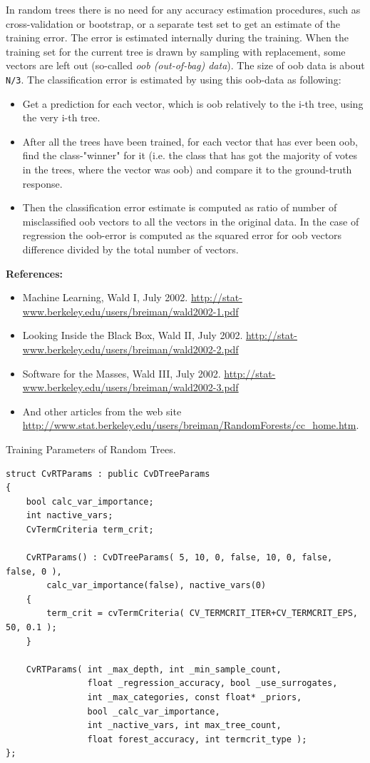 In random trees there is no need for any accuracy estimation procedures, such as cross-validation or bootstrap, or a separate test set to get an estimate of the training error. The error is estimated internally during the training. When the training set for the current tree is drawn by sampling with replacement, some vectors are left out (so-called \emph{oob (out-of-bag) data}). The size of oob data is about \texttt{N/3}. The classification error is estimated by using this oob-data as following:
\begin{itemize}
\item Get a prediction for each vector, which is oob relatively to the i-th tree, using the very i-th tree.
\item After all the trees have been trained, for each vector that has ever been oob, find the class-"winner" for it (i.e. the class that has got the majority of votes in the trees, where the vector was oob) and compare it to the ground-truth response.
\item Then the classification error estimate is computed as ratio of number of misclassified oob vectors to all the vectors in the original data. In the case of regression the oob-error is computed as the squared error for oob vectors difference divided by the total number of vectors.
\end{itemize}

\textbf{References:}
\begin{itemize}
\item Machine Learning, Wald I, July 2002.
    \url{http://stat-www.berkeley.edu/users/breiman/wald2002-1.pdf}
\item Looking Inside the Black Box, Wald II, July 2002.
    \url{http://stat-www.berkeley.edu/users/breiman/wald2002-2.pdf}
\item Software for the Masses, Wald III, July 2002.
    \url{http://stat-www.berkeley.edu/users/breiman/wald2002-3.pdf}
\item And other articles from the web site \url{http://www.stat.berkeley.edu/users/breiman/RandomForests/cc_home.htm}.
\end{itemize}

Training Parameters of Random Trees.

\begin{lstlisting}
struct CvRTParams : public CvDTreeParams
{
    bool calc_var_importance;
    int nactive_vars;
    CvTermCriteria term_crit;

    CvRTParams() : CvDTreeParams( 5, 10, 0, false, 10, 0, false, false, 0 ),
        calc_var_importance(false), nactive_vars(0)
    {
        term_crit = cvTermCriteria( CV_TERMCRIT_ITER+CV_TERMCRIT_EPS, 50, 0.1 );
    }

    CvRTParams( int _max_depth, int _min_sample_count,
                float _regression_accuracy, bool _use_surrogates,
                int _max_categories, const float* _priors,
                bool _calc_var_importance,
                int _nactive_vars, int max_tree_count,
                float forest_accuracy, int termcrit_type );
};
\end{lstlisting}

